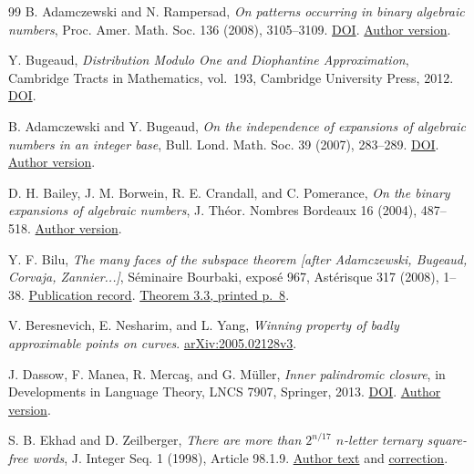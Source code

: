 \documentclass[11pt,reqno,a4paper]{amsart}
\theoremstyle{remark}
\begin{document}
\begin{thebibliography}{99}
B. Adamczewski and N. Rampersad,
\emph{On patterns occurring in binary algebraic numbers},
Proc. Amer. Math. Soc. 136 (2008), 3105--3109.
\href{https://doi.org/10.1090/S0002-9939-08-09319-2}{DOI}.
\href{https://adamczewski.perso.math.cnrs.fr/Overlap.pdf}{Author version}.

Y. Bugeaud,
\emph{Distribution Modulo One and Diophantine Approximation},
Cambridge Tracts in Mathematics, vol.~193, Cambridge University Press,
2012.
\href{https://doi.org/10.1017/CBO9781139017732}{DOI}.

B. Adamczewski and Y. Bugeaud, \emph{On the independence of expansions of algebraic numbers in an integer base}, Bull. Lond. Math. Soc. 39 (2007), 283--289. \href{https://doi.org/10.1112/blms/bdl036}{DOI}. \href{https://adamczewski.perso.math.cnrs.fr/ProxNbsAlg.pdf}{Author version}.

D. H. Bailey, J. M. Borwein, R. E. Crandall, and C. Pomerance, \emph{On the binary expansions of algebraic numbers}, J. Th\'eor. Nombres Bordeaux 16 (2004), 487--518. \href{https://www.davidhbailey.com/dhbpapers/algebraic-bits.pdf}{Author version}.

Y. F. Bilu, \emph{The many faces of the subspace theorem [after
Adamczewski, Bugeaud, Corvaja, Zannier...]}, S\'eminaire Bourbaki,
expos\'e 967, Ast\'erisque 317 (2008), 1--38.
\href{https://www.numdam.org/book-part/AST_2008__317__1_0/}{Publication record}.
\href{https://arxiv.org/pdf/0907.2098#page=8}{Theorem 3.3, printed p.~8}.

V. Beresnevich, E. Nesharim, and L. Yang, \emph{Winning property of badly approximable points on curves}. \href{https://arxiv.org/abs/2005.02128v3}{arXiv:2005.02128v3}.

J. Dassow, F. Manea, R. Merca\c{s}, and G. M\"uller, \emph{Inner palindromic closure}, in Developments in Language Theory, LNCS 7907, Springer, 2013. \href{https://doi.org/10.1007/978-3-642-38771-5_15}{DOI}. \href{https://oceanrep.geomar.de/id/eprint/21189/1/DasManMerMul_DLT12_CR.pdf}{Author version}.

S. B. Ekhad and D. Zeilberger, \emph{There are more than $2^{n/17}$ $n$-letter ternary square-free words}, J. Integer Seq. 1 (1998), Article 98.1.9. \href{https://cs.uwaterloo.ca/journals/JIS/zeil.html}{Author text} and \href{https://cs.uwaterloo.ca/journals/JIS/zeile.html}{correction}.


\end{thebibliography}
\end{document}
